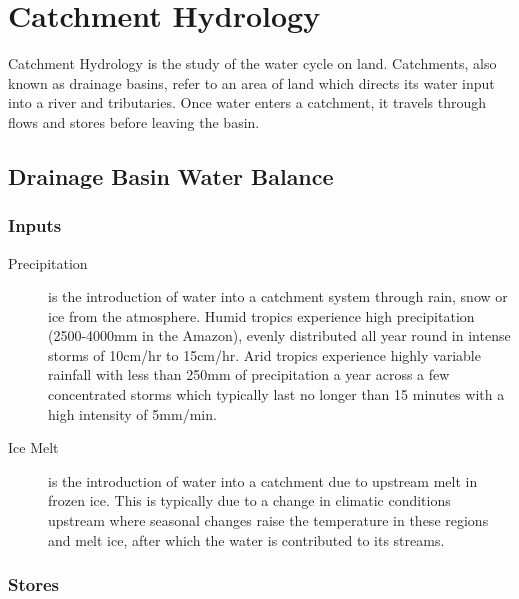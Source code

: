 \documentclass[../../main]{subfiles}
\begin{document}
\section{Catchment Hydrology}

	Catchment Hydrology is the study of the water cycle on land. Catchments, also known as drainage basins, refer to an area of land which directs its water input into a river and tributaries. Once water enters a catchment, it travels through flows and stores before leaving the basin.

\subsection{Drainage Basin Water Balance}

\subsubsection{Inputs}

	\begin{description}
		\item[Precipitation] is the introduction of water into a catchment system through rain, snow or ice from the atmosphere. Humid tropics experience high precipitation (2500-4000mm in the Amazon), evenly distributed all year round in intense storms of 10cm/hr to 15cm/hr. Arid tropics experience highly variable rainfall with less than 250mm of precipitation a year across a few concentrated storms which typically last no longer than 15 minutes with a high intensity of 5mm/min.
		\item[Ice Melt] is the introduction of water into a catchment due to upstream melt in frozen ice. This is typically due to a change in climatic conditions upstream where seasonal changes raise the temperature in these regions and melt ice, after which the water is contributed to its streams.
	\end{description}

\subsubsection{Stores}
\end{document}
